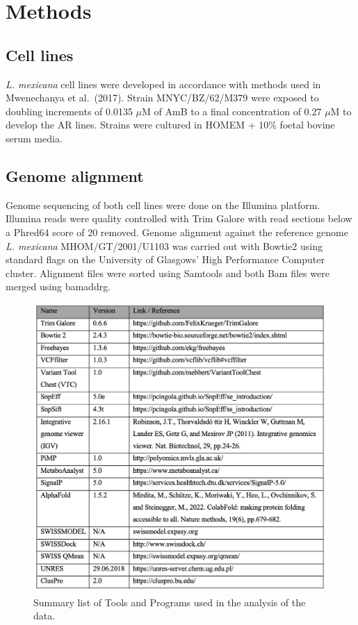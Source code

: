 \documentclass{bioinfo}
\begin{document}
\section{Methods}

\subsection{Cell lines}

\emph{L. mexicana} cell lines were developed in accordance with methods
used in Mwenechanya et al.~(2017). Strain MNYC/BZ/62/M379 were exposed
to doubling increments of 0.0135 \(\mu\)M of AmB to a final
concentration of 0.27 \(\mu\)M to develop the AR lines. Strains were
cultured in HOMEM + 10\% foetal bovine serum media.

\subsection{Genome alignment}

Genome sequencing of both cell lines were done on the Illumina platform.
Illumina reads were quality controlled with Trim Galore with read
sections below a Phred64 score of 20 removed. Genome alignment against
the reference genome \emph{L. mexicana} MHOM/GT/2001/U1103 was carried
out with Bowtie2 using standard flags on the University of Glasgows'
High Performance Computer cluster. Alignment files were sorted using
Samtools and both Bam files were merged using bamaddrg.

\begin{figure}
\includegraphics[width=1\linewidth]{Table1} \caption{Summary list of Tools and Programs used in the analysis of the data.}\label{fig:table1}
\end{figure}
\end{document}
